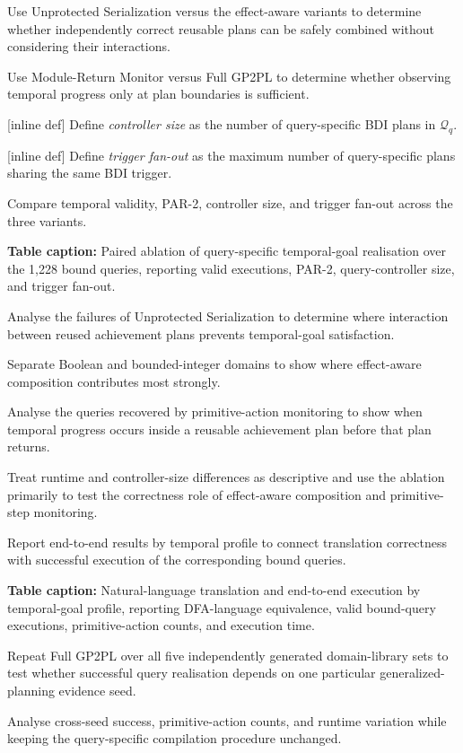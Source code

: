 Use Unprotected Serialization versus the effect-aware variants to determine whether independently correct reusable plans can be safely combined without considering their interactions.

Use Module-Return Monitor versus Full GP2PL to determine whether observing temporal progress only at plan boundaries is sufficient.

[inline def] Define \emph{controller size} as the number of query-specific BDI plans in \(\mathcal{Q}_q\).

[inline def] Define \emph{trigger fan-out} as the maximum number of query-specific plans sharing the same BDI trigger.

Compare temporal validity, PAR-2, controller size, and trigger fan-out across the three variants.

\textbf{Table caption:} Paired ablation of query-specific temporal-goal realisation over the 1,228 bound queries, reporting valid executions, PAR-2, query-controller size, and trigger fan-out.

Analyse the failures of Unprotected Serialization to determine where interaction between reused achievement plans prevents temporal-goal satisfaction.

Separate Boolean and bounded-integer domains to show where effect-aware composition contributes most strongly.

Analyse the queries recovered by primitive-action monitoring to show when temporal progress occurs inside a reusable achievement plan before that plan returns.

Treat runtime and controller-size differences as descriptive and use the ablation primarily to test the correctness role of effect-aware composition and primitive-step monitoring.

Report end-to-end results by temporal profile to connect translation correctness with successful execution of the corresponding bound queries.

\textbf{Table caption:} Natural-language translation and end-to-end execution by temporal-goal profile, reporting DFA-language equivalence, valid bound-query executions, primitive-action counts, and execution time.

Repeat Full GP2PL over all five independently generated domain-library sets to test whether successful query realisation depends on one particular generalized-planning evidence seed.

Analyse cross-seed success, primitive-action counts, and runtime variation while keeping the query-specific compilation procedure unchanged.

